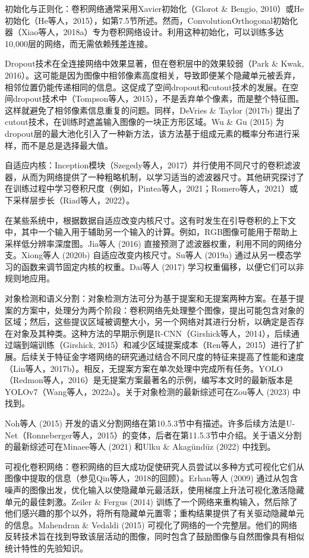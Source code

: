 初始化与正则化：卷积网络通常采用Xavier初始化（Glorot \& Bengio, 2010）或He初始化（He等人，2015），如第7.5节所述。然而，ConvolutionOrthogonal初始化器（Xiao等人，2018a）专为卷积网络设计。利用这种初始化，可以训练多达10,000层的网络，而无需依赖残差连接。

Dropout技术在全连接网络中效果显著，但在卷积层中的效果较弱（Park \& Kwak, 2016）。这可能是因为图像中相邻像素高度相关，导致即便某个隐藏单元被丢弃，相邻位置仍能传递相同的信息。这促成了空间dropout和cutout技术的发展。在空间dropout技术中（Tompson等人，2015），不是丢弃单个像素，而是整个特征图。这样就避免了相邻像素信息重复的问题。同样，DeVries \& Taylor (2017b) 提出了cutout技术，在训练时遮盖输入图像的一块正方形区域。Wu \& Gu (2015) 为dropout层的最大池化引入了一种新方法，该方法基于组成元素的概率分布进行采样，而不是总是选择最大值。

自适应内核：Inception模块（Szegedy等人，2017）并行使用不同尺寸的卷积滤波器，从而为网络提供了一种粗略机制，以学习适当的滤波器尺寸。其他研究探讨了在训练过程中学习卷积尺度（例如，Pintea等人，2021；Romero等人，2021）或下采样层步长（Riad等人，2022）。

在某些系统中，根据数据自适应改变内核尺寸。这有时发生在引导卷积的上下文中，其中一个输入用于辅助另一个输入的计算。例如，RGB图像可能用于帮助上采样低分辨率深度图。Jia等人 (2016) 直接预测了滤波器权重，利用不同的网络分支。Xiong等人 (2020b) 自适应改变内核尺寸。Su等人 (2019a) 通过从另一模态学习的函数来调节固定内核的权重。Dai等人 (2017) 学习权重偏移，以便它们可以非规则地应用。

对象检测和语义分割：对象检测方法可分为基于提案和无提案两种方案。在基于提案的方案中，处理分为两个阶段：卷积网络先处理整个图像，提出可能包含对象的区域；然后，这些提议区域被调整大小，另一个网络对其进行分析，以确定是否存在对象及其种类。这种方法的早期示例是R-CNN（Girshick等人，2014），后续通过端到端训练（Girshick, 2015）和减少区域提案成本（Ren等人，2015）进行了扩展。后续关于特征金字塔网络的研究通过结合不同尺度的特征来提高了性能和速度（Lin等人，2017b）。相反，无提案方案在单次处理中完成所有任务。YOLO（Redmon等人，2016）是无提案方案最著名的示例，编写本文时的最新版本是YOLOv7（Wang等人，2022a）。关于对象检测的最新综述可在Zou等人 (2023) 中找到。

Noh等人 (2015) 开发的语义分割网络在第10.5.3节中有描述。许多后续方法是U-Net（Ronneberger等人，2015）的变体，后者在第11.5.3节中介绍。关于语义分割的最新综述可在Minaee等人 (2021) 和Ulku \& Akagündüz (2022) 中找到。

可视化卷积网络：卷积网络的巨大成功促使研究人员尝试以多种方式可视化它们从图像中提取的信息（参见Qin等人，2018的回顾）。Erhan等人 (2009) 通过从包含噪声的图像出发，优化输入以使隐藏单元最活跃，使用梯度上升法可视化激活隐藏单元的最佳刺激。Zeiler \& Fergus (2014) 训练了一个网络来重构输入，然后除了他们感兴趣的那个以外，将所有隐藏单元置零；重构结果提供了有关驱动隐藏单元的信息。Mahendran \& Vedaldi (2015) 可视化了网络的一个完整层。他们的网络反转技术旨在找到导致该层活动的图像，同时包含了鼓励图像与自然图像具有相似统计特性的先验知识。

